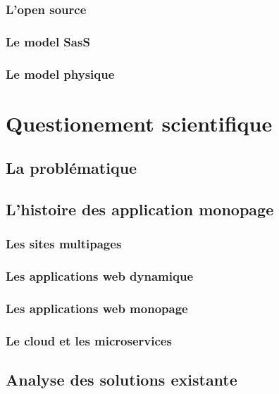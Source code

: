 \documentclass[twoside, 12pt]{report}
\begin{document}
        \section{L'open source}

        \section{Le model SasS}

        \section{Le model physique}

\part{Questionement scientifique}

	\chapter{La problématique}
    
   	\chapter{L'histoire des application monopage}
    
    	\section{Les sites multipages}
        
        \section{Les applications web dynamique}
        
        \section{Les applications web monopage}
        
        \section{Le cloud et les microservices}
        
	\chapter{Analyse des solutions existante}
    	
\end{document}
